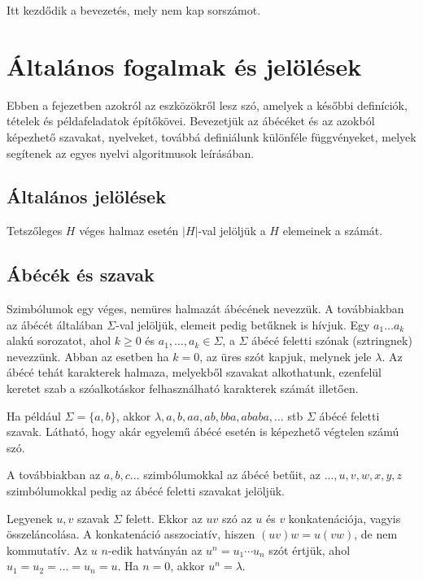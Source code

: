\documentclass[12pt]{report}
\theoremstyle{definition}
\begin{document}
Itt kezdődik a bevezetés, mely nem kap sorszámot.



\chapter{Általános fogalmak és jelölések}

Ebben a fejezetben azokról az eszközökről lesz szó, amelyek a későbbi definíciók, tételek és példafeladatok építőkövei. Bevezetjük az ábécéket és az azokból képezhető szavakat, nyelveket, továbbá definiálunk különféle függvényeket, melyek segítenek az egyes nyelvi algoritmusok leírásában.

\section{Általános jelölések}

Tetszőleges $H$ véges halmaz esetén $|H|$-val jelöljük a $H$ elemeinek a számát.


\section{Ábécék és szavak}

Szimbólumok egy  véges, nemüres halmazát ábécének nevezzük.  A továbbiakban az ábécét általában $\Sigma$-val jelöljük, elemeit pedig betűknek is hívjuk.
Egy $a_1\ldots a_k$ alakú sorozatot, ahol $k\geq 0$ és $a_1,\ldots,a_k\in\Sigma$, a $\Sigma$ ábécé feletti szónak (sztringnek) nevezzünk. Abban az esetben ha $k = 0$, az üres szót kapjuk, melynek jele $\lambda$. Az ábécé tehát karakterek halmaza, melyekből szavakat alkothatunk, ezenfelül keretet szab a szóalkotáskor felhasználható karakterek számát illetően.

\noindent Ha például $\Sigma=\{a,b\}$, akkor  $\lambda, a, b, aa, ab, bba, ababa,\ldots$ stb  $\Sigma$ ábécé feletti szavak. Látható, hogy akár egyelemű ábécé esetén is képezhető végtelen számú szó.

A továbbiakban az $a,b,c...$ szimbólumokkal az ábécé betűit, az $...,u,v,w,x,y,z$ szimbólumokkal pedig az ábécé feletti szavakat jelöljük.

Legyenek $u,v$ szavak $\Sigma$ felett. Ekkor az $uv$ szó az $u$ és $v$ konkatenációja, vagyis összeláncolása. A konkatenáció asszociatív, hiszen $(uv)w = u(vw)$, de nem kommutatív. Az $u$ $n$-edik hatványán az $u^n = u_1\cdots u_n$ szót értjük, ahol $u_1 = u_2 = \ldots = u_n = u$. Ha $n = 0$, akkor $u^n = \lambda$.
\end{document}
